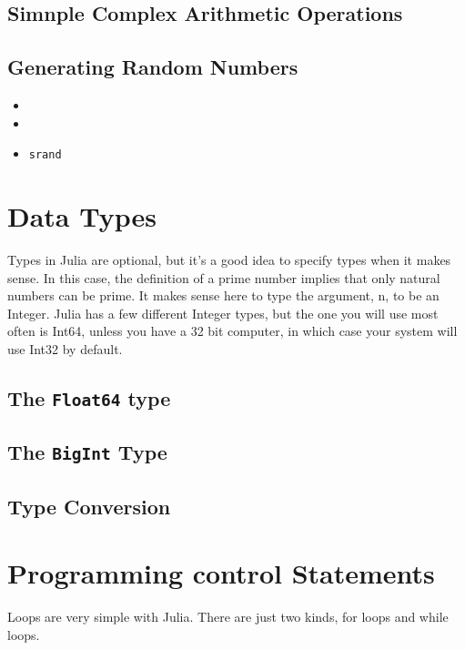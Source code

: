 \begin{framed}
\begin{verbatim}

\end{verbatim}
\end{framed}
\subsection{Simnple Complex Arithmetic Operations}

\subsection{Generating Random Numbers}

\begin{itemize}
\item
\item
\item \texttt{srand}
\end{itemize}

\section{Data Types}
Types in Julia are optional, but it's a good idea to specify types when it makes sense. In this case, the definition of a prime number implies that only natural numbers can be prime. It makes sense here to type the argument, n, to be an Integer. Julia has a few different Integer types, but the one you will use most often is Int64, unless you have a 32 bit computer, 
in which case your system will use Int32 by default.
\subsection{The \texttt{Float64} type }
\subsection{The \texttt{BigInt} Type}

\subsection{Type Conversion}
\newpage
\section{Programming control Statements}
Loops are very simple with Julia. There are just two kinds, for loops and while loops.
